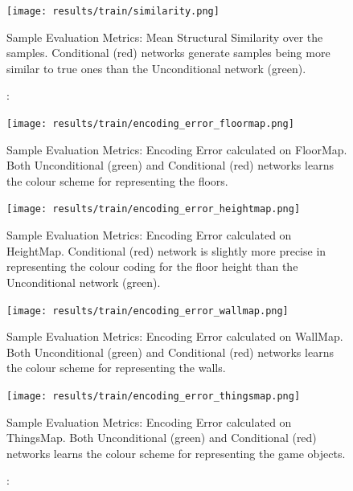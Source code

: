 \begin{figure}[!htb] 
	\begin{minipage}[b]{\linewidth}
		\centering
		\texttt{[image: results/train/similarity.png]} 
		\caption[Sample Evaluation Metrics: Mean Structural Similarity Index]: {Sample Evaluation Metrics: Mean Structural Similarity over the samples. Conditional (red) networks generate samples being more similar to true ones than the Unconditional network (green).}
		\label{fig:train-similarity}
	\end{minipage}
\end{figure}


\begin{figure}[!htb] 
	\begin{minipage}[b]{0.45\linewidth}
		\centering
		\texttt{[image: results/train/encoding\_error\_floormap.png]} 
		\caption[Sample Evaluation Metrics: Encoding Error (Floormap)]: {Sample Evaluation Metrics: Encoding Error calculated on FloorMap. Both Unconditional (green) and Conditional (red) networks learns the colour scheme for representing the floors.}
		\label{fig:train-encoding_error-floormap}
	\end{minipage}
	\hfil
	\begin{minipage}[b]{0.45\linewidth}
		\centering
		\texttt{[image: results/train/encoding\_error\_heightmap.png]} 
		\caption[Sample Evaluation Metrics: Encoding Error (HeightMap)]: {Sample Evaluation Metrics: Encoding Error calculated on HeightMap. Conditional (red) network is slightly more precise in representing the colour coding for the floor height than the Unconditional network (green).}
		\label{fig:train-encoding-error-heightmap}
	\end{minipage}
	
	\begin{minipage}[b]{0.45\linewidth}
		\centering
		\texttt{[image: results/train/encoding\_error\_wallmap.png]} 
		\caption[Sample Evaluation Metrics: Encoding Error (WallMap)]: {Sample Evaluation Metrics: Encoding Error calculated on WallMap. Both Unconditional (green) and Conditional (red) networks learns the colour scheme for representing the walls.}
		\label{fig:train-encoding-error-wallmap}
	\end{minipage}
	\hfil
	\begin{minipage}[b]{0.45\linewidth}
		\centering
		\texttt{[image: results/train/encoding\_error\_thingsmap.png]} 
		\caption[Sample Evaluation Metrics: Encoding Error (ThingsMap)]: {Sample Evaluation Metrics: Encoding Error calculated on ThingsMap. Both Unconditional (green) and Conditional (red) networks learns the colour scheme for representing the game objects.}
		\label{fig:train-encoding-error-thingsmap}
	\end{minipage}
\end{figure}


